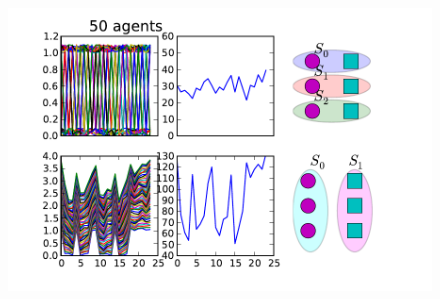 \documentclass[xcolor=dvipsnames]{beamer}
\begin{document}
\begin{frame}
\begin{columns}
\begin{column}{.5 \linewidth}
\begin{figure}
				\includegraphics[scale=.36]{50_agents.pdf}
			\end{figure}
		\end{column}
	\end{columns}		
	
\end{frame}

%
%
\end{document}

